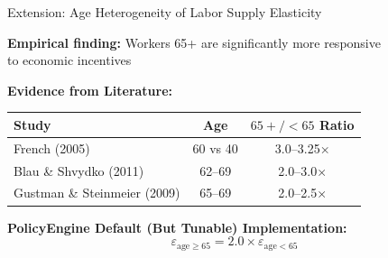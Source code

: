 \documentclass[11pt,aspectratio=169]{beamer}
\begin{document}
\begin{frame}{Extension: Age Heterogeneity of Labor Supply Elasticity}
\begin{center}
\textbf{Empirical finding:} Workers 65+ are significantly more responsive\\
to economic incentives

\vspace{0.3cm}

\textbf{Evidence from Literature:}

\vspace{0.2cm}
\small
\begin{tabular}{lcc}
\toprule
\textbf{Study} & \textbf{Age} & \textbf{$65+/<65$ Ratio} \\
\midrule
French (2005) & 60 vs 40 & 3.0–3.25× \\
Blau \& Shvydko (2011) & 62–69 & 2.0–3.0× \\
Gustman \& Steinmeier (2009) & 65–69 & 2.0–2.5× \\
\bottomrule
\end{tabular}

\vspace{0.3cm}
\normalsize
\textbf{PolicyEngine Default (But Tunable) Implementation:}
\begin{equation*}
\varepsilon_{\text{age} \geq 65} = 2.0 \times \varepsilon_{\text{age} < 65}
\end{equation*}
\end{center}

\end{frame}
\end{document}
